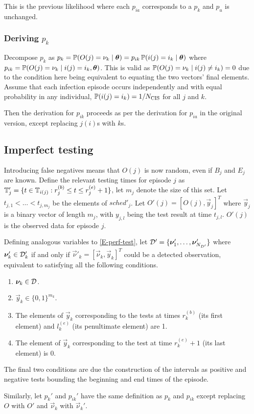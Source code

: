 \documentclass[thesis.tex]{subfiles}
\begin{document}
This is the previous likelihood where each $p_{ia}$ corresponds to a $p_k$ and $p_u$ is unchanged.

\subsubsection{Deriving $p_k$}

Decompose $p_k$ as $p_k = \operatorname{\mathbb{P}}(O(j) = \nu_k \mid \bm{\theta}) = p_{ik} \operatorname{\mathbb{P}}(i(j) = i_k \mid \bm{\theta})$ where $p_{ik} = \operatorname{\mathbb{P}}(O(j) = \nu_k \mid i(j) = i_k, \bm{\theta})$.
This is valid as $\operatorname{\mathbb{P}}(O(j) = \nu_k \mid i(j) \neq i_k) = 0$ due to the condition here being equivalent to equating the two vectors' final elements.
Assume that each infection episode occurs independently and with equal probability in any individual, \ie $\operatorname{\mathbb{P}}(i(j) = i_k) = 1/N_\text{CIS}$ for all $j$ and $k$.

Then the derivation for $p_{ik}$ proceeds as per the derivation for $p_{ia}$ in the original version, except replacing $j(i)$s with $k$s.

\subsection{Imperfect testing}

Introducing false negatives means that $O(j)$ is now random, even if $B_j$ and $E_j$ are known.
Define the relevant testing times for episode $j$ as $\mathbb{T}'_j = \{ t \in \mathbb{T}_{i(j)} : r_j^{(b)} \leq t \leq r_j^{(e)} + 1 \}$, let $m_j$ denote the size of this set.
Let $t_{j,1} < \dots < t_{j,m_j}$ be the elements of $sched'_j$.
Let $O'(j) = [O(j), \vec{y}_j]^T$ where $\vec{y}_j$ is a binary vector of length $m_j$, with $y_{j,l}$ being the test result at time $t_{j,l}$.
$O'(j)$ is the observed data for episode $j$.

Defining analogous variables to \cref{E-perf-test}, let $\mathcal{D}' = \{ \bm{\nu}'_1, \dots, \bm{\nu}'_{N_{D'}} \}$ where $\bm{\nu}'_k \in \mathcal{D}'_k$ if and only if $\vec{\nu}'_k = [\vec{\nu}_k, \vec{y}_k]^T$ could be a detected observation, equivalent to satisfying all the following conditions.
\begin{enumerate}
  \item $\bm{\nu}_k \in \mathcal{D}$.
  \item $\vec{y}_k \in \{0, 1\}^{m_k}$.
  \item The elements of $\vec{y}_k$ corresponding to the tests at times $r_k^{(b)}$ (its first element) and $l_k^{(e)}$ (its penultimate element) are 1.
  \item The element of $\vec{y}_k$ corresponding to the test at time $r_k^{(e)} + 1$ (its last element) is 0.
\end{enumerate}
The final two conditions are due the construction of the intervals as positive and negative tests bounding the beginning and end times of the episode.

Similarly, let $p_k'$ and $p_{ik}'$ have the same definition as $p_k$ and $p_{ik}$ except replacing $O$ with $O'$ and $\vec{\nu}_k$ with $\vec{\nu}_k'$.
\end{document}

